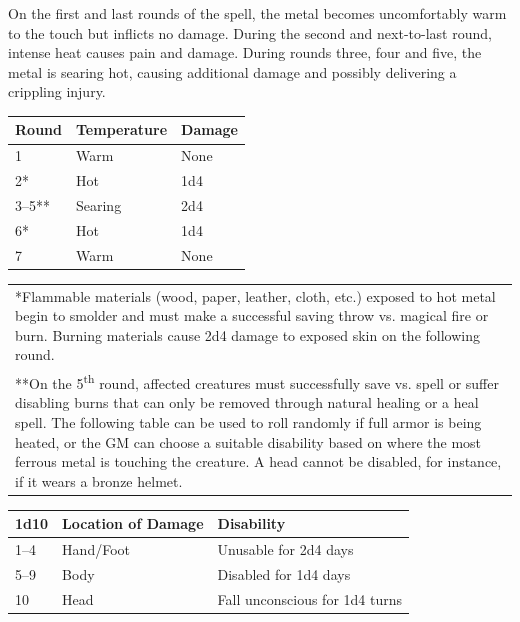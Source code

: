 \begin{multicols}{2}
On the first and last rounds of the spell, the metal becomes uncomfortably warm to the touch but inflicts no damage.  During the second and next-to-last round, intense heat causes pain and damage.  During rounds three, four and five, the metal is searing hot, causing additional damage and possibly delivering a crippling injury. 

\noindent
\begin{tabular}{|p{}|p{}|p{}|}
\hline
Round	& Temperature	& Damage \\
\hline\hline
\rowcolor[gray]{.9}1	& Warm	& None \\
2*	& Hot	& 1d4 \\
\rowcolor[gray]{.9}3--5**	& Searing	& 2d4 \\
6*	& Hot	& 1d4 \\
\rowcolor[gray]{.9}7	& Warm	& None \\
\hline
\end{tabular}
\noindent\begin{tabular}{p{}}
*Flammable materials (wood, paper, leather, cloth, etc.) exposed to hot metal begin to smolder and must make a successful saving throw vs. magical fire or burn.  Burning materials cause 2d4 damage to exposed skin on the following round. \\
**On the 5\textsuperscript{th} round, affected creatures must successfully save vs. spell or suffer disabling burns that can only be removed through natural healing or a heal spell.  The following table can be used to roll randomly if full armor is being heated, or the GM can choose a suitable disability based on where the most ferrous metal is touching the creature.  A head cannot be disabled, for instance, if it wears a bronze helmet. \\
\end{tabular}\vspace{.5em}

\noindent
\begin{tabular}{|p{}|p{}|p{}|}
\hline
1d10	& Location of Damage	& Disability \\
\hline\hline
\rowcolor[gray]{.9}1--4	& Hand/Foot	& Unusable for 2d4 days \\
5--9	& Body	& Disabled for 1d4 days \\
\rowcolor[gray]{.9}10	& Head	& Fall unconscious for 1d4 turns \\
\hline
\end{tabular}


\end{multicols}

